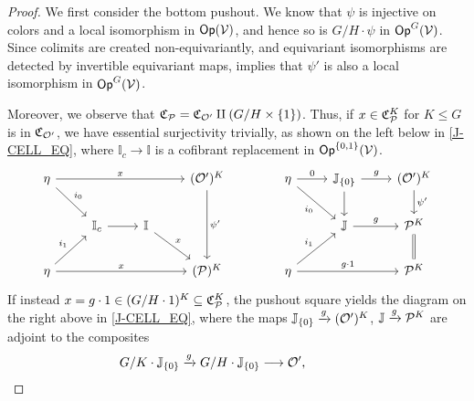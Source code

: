 \documentclass[a4paper,10pt
,draft
]{article}%
\renewcommand{\F}{\mathcal F}
\newcommand{\I}{\mathbb I}
\newcommand{\J}{\mathbb J}
\renewcommand{\1}{\eta}%
\begin{document}
\begin{proof}
      We first consider the bottom pushout.
      We know that $\psi$ is injective on colors and a local isomorphism in $\Op(\V)$,
      and hence so is $G/H \cdot \psi$ in $\Op^G(\V)$.
      Since colimits are created non-equivariantly, and equivariant isomorphisms are detected by invertible equivariant maps,
      \cite[Prop B.22]{Cav} implies that $\psi'$ is also a local isomorphism in $\Op^G(\V)$.
      
      Moreover, we observe that $\C_{\P} = \C_{\O'} \amalg (G/H \times \set{1})$.
      Thus, if $x \in \C_{\P}^K$ for $K \leq G$ is in $\C_{\O'}$, we have essential surjectivity trivially,
      as shown on the left below in \eqref{J-CELL_EQ},
      where $\I_c \to \I$ is a cofibrant replacement in $\Op^{\set{0,1}}(\V)$.
      \begin{equation}
            \label{J-CELL_EQ}
            \begin{tikzcd}
                  \1 \arrow[rrr, "x"] \arrow[dr, " i_0"]
                  &&&
                  (\O')^K \arrow[dd, "\psi'"]
                  &[15pt] %
                  \1 \arrow[r, "0"] \arrow[dr, "i_0"']
                  &
                  \J_{\set{0}} \arrow[d] \arrow[r, "g"]
                  &
                  (\O')^K \arrow[d, "{\psi'}"]
                  \\
                  &
                  \I_c \arrow[r]
                  &
                  \I \arrow[dr, "x"]
                  &
                  & %
                  &
                  \J \arrow[r, "g"]
                  &
                  \P^K \arrow[d, equal]
                  \\
                  \1 \arrow[ur, " i_1"] \arrow[rrr,"x"]
                  &&&
                  (\P)^K
                  & %
                  \1 \arrow[rr, "g \cdot 1"] \arrow[ur, "i_1"]
                  &&
                  \P^K
            \end{tikzcd}
      \end{equation}
      If instead $x  = g \cdot 1 \in (G/H \cdot 1)^K \subseteq \mathfrak C_\P^K$,
      the pushout square yields the diagram on the right above in \eqref{J-CELL_EQ},
      where the maps $\J_{\set{0}} \xrightarrow{g} (\O')^K$, $\J \xrightarrow{g} \P^K$ are adjoint to the composites
      \begin{equation}
            G/K \cdot \J_{\set{0}} \xrightarrow{g} G/H \cdot \J_{\set{0}} \longto \O',
            \qquad \qquad

\end{equation}
\end{proof}
\end{document}

